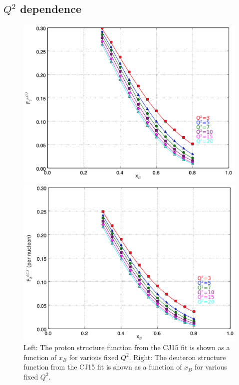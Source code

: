 \documentclass[oneside]{article}
\begin{document}
\subsection{$Q^2$ dependence}

\begin{figure}
\begin{minipage}{0.5\textwidth}
 \includegraphics[width=\textwidth]{plots/p_CJ.png}
\end{minipage}\hfill\begin{minipage}{0.5\textwidth}
 \includegraphics[width=\textwidth]{plots/d_CJ.png}
 \end{minipage}
  \caption[Proton and deuteron from CJ15]{Left: The proton structure function from the CJ15 fit is shown as a function of $x_B$ for various fixed $Q^2$. Right: The deuteron structure function from the CJ15 fit is shown as a function of $x_B$ for various fixed $Q^2$.}
  \label{fig:pd_CJ15}
\end{figure} 
 
\end{document}
